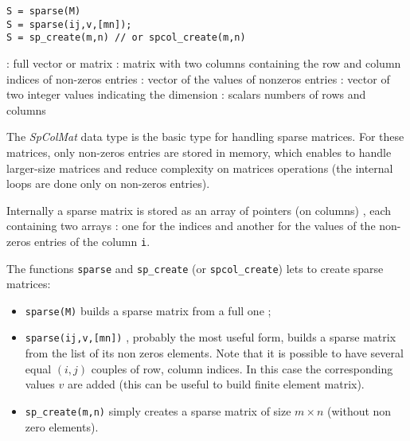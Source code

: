 
\begin{mandesc}
\end{mandesc}
\begin{calling_sequence}
\begin{verbatim}
S = sparse(M)
S = sparse(ij,v,[mn]);
S = sp_create(m,n) // or spcol_create(m,n)
\end{verbatim}

\end{calling_sequence}
\begin{parameters}
  \begin{varlist}
    :  full vector or matrix  
    : matrix with two columns containing the row and column indices of 
                non-zeros entries  
    : vector of the values of nonzeros entries
    : vector of two integer values indicating the dimension 
    : scalars numbers of rows and columns
  \end{varlist}
\end{parameters}

\begin{mandescription}

The \emph{SpColMat} data type is the basic type for handling sparse matrices. 
For these matrices, only non-zeros entries are stored in memory, which enables to 
handle larger-size matrices and reduce complexity on matrices operations (the internal
loops are done only on non-zeros entries).

Internally a sparse matrix is stored as an array of pointers (on columns) , each containing 
two arrays : one for the indices and another for the values of the non-zeros entries of
the column \verb+i+. 
 
The functions \verb+sparse+ and \verb+sp_create+ (or  \verb+spcol_create+) lets to create
sparse matrices:
\begin{itemize}
\item \verb+sparse(M)+ builds a sparse matrix from a full one ;
\item \verb+sparse(ij,v,[mn])+ , probably the most useful form, builds a sparse matrix
   from the list of its non zeros elements. Note that it is possible to have several equal
   $(i,j)$ couples of row, column indices. In this case the corresponding values $v$ are 
   added (this can be useful to build finite element matrix).
\item \verb+sp_create(m,n)+ simply creates a sparse matrix of size $m \times n$ (without
   non zero elements).   
\end{itemize}

\end{mandescription}

